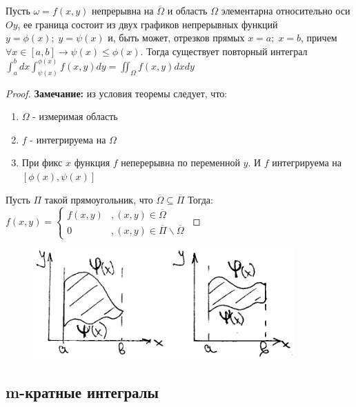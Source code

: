 \begin{theorem}
	Пусть $\omega=f(x,y)$ непрерывна на $\overline{\Omega} $ и область $\Omega$ элементарна относительно оси $Oy$, ее граница состоит из двух графиков непрерывных функций $y=\phi(x);\; y=\psi(x) $ и, быть может, отрезков прямых $x=a; \; x=b $, причем $\forall x\in [a,b] \rightarrow  \psi(x) \leq \phi(x).$ Тогда существует повторный интеграл $\int_a^b dx \int_{\psi(x)}^{\phi(x)} f(x,y) dy = \iint_{\Omega} f(x,y) dxdy $
\end{theorem}
\begin{proof}
	\textbf{Замечание:} из условия теоремы следует, что: 
	\begin{enumerate}
		\item $\Omega $ - измеримая область
		\item $f$ - интегрируема на $\Omega$
		\item При фикс $x$  функция $ f$ неперерывна по переменной $y$. И $f$ интегрируема на $[\phi(x), \psi(x)] $
	\end{enumerate}
	
	Пусть $\Pi$ такой прямоугольник, что $\overline{\Omega}\subseteq \overline{\Pi} $
	Тогда: $f(x,y)=\begin{cases}
		f(x,y)&, (x,y) \in \overline{\Omega}\\
		0&, (x,y) \in  \overline{\Pi}\backslash \overline{\Omega}
	\end{cases}$
	
\end{proof}

	\begin{figure}[H]
	\includegraphics[width=100mm]{lect7pic1}
	\\
\end{figure}


\subsection{m-кратные интегралы}


